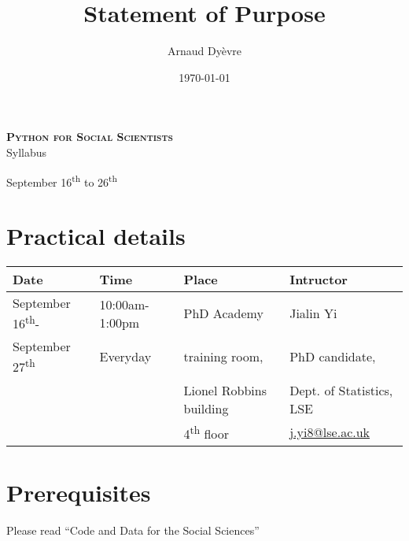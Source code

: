 \documentclass[12pt, titlepage]{article}
\title{Statement of Purpose}
\author{Arnaud Dyèvre}
\date{\today}
\begin{document}
\begin{center}
\Large
\end{center}


\begin{center}
\textbf{\Large \textsc{Python for Social Scientists}} \\ \Large Syllabus\\

\end{center}

\begin{center}
\normalsize September 16\textsuperscript{th} to 26\textsuperscript{th}

\end{center}


\begin{center}

\end{center}


\section*{Practical details}

\begin{center}
\begin{tabular}{ p{3cm}p{3cm}p{4.5cm}p{4.5cm} } 
\hline
 \textbf{Date} & \textbf{Time} & \textbf{Place} & \textbf{Intructor} \\
\hline
 September 16\textsuperscript{th}- & 10:00am-1:00pm & PhD Academy & Jialin Yi \\
 September 27\textsuperscript{th} & Everyday & training room, & PhD candidate,  \\
     &   & Lionel Robbins building &  Dept. of Statistics, LSE \\
    &   & 4\textsuperscript{th} floor &  \href{
mailto:j.yi8@lse.ac.uk}{j.yi8@lse.ac.uk} \\
\hline
\end{tabular}
\end{center}

\section*{Prerequisites}

Please read ``Code and Data for the Social Sciences''
\end{document}
